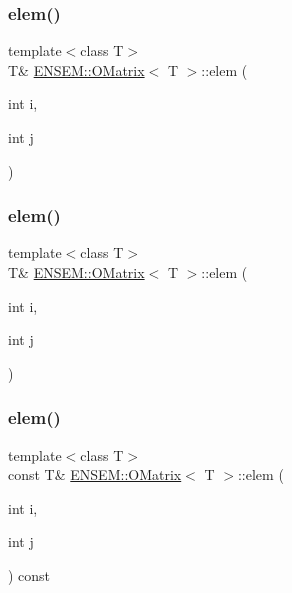\subsubsection{\texorpdfstring{elem()}{elem()}\hspace{0.1cm}{\footnotesize\ttfamily [2/6]}}
{\footnotesize\ttfamily template$<$class T$>$ \\
T\& \mbox{\hyperlink{classENSEM_1_1OMatrix}{E\+N\+S\+E\+M\+::\+O\+Matrix}}$<$ T $>$\+::elem (\begin{DoxyParamCaption}\item[{int}]{i,  }\item[{int}]{j }\end{DoxyParamCaption})\hspace{0.3cm}{\ttfamily [inline]}}

\mbox{\label{classENSEM_1_1OMatrix_a0a15388ff6dc8159664f6dc14a35b399}} 
\subsubsection{\texorpdfstring{elem()}{elem()}\hspace{0.1cm}{\footnotesize\ttfamily [3/6]}}
{\footnotesize\ttfamily template$<$class T$>$ \\
T\& \mbox{\hyperlink{classENSEM_1_1OMatrix}{E\+N\+S\+E\+M\+::\+O\+Matrix}}$<$ T $>$\+::elem (\begin{DoxyParamCaption}\item[{int}]{i,  }\item[{int}]{j }\end{DoxyParamCaption})\hspace{0.3cm}{\ttfamily [inline]}}

\mbox{\label{classENSEM_1_1OMatrix_a27e0c9e142522126542006530bd7007b}} 
\subsubsection{\texorpdfstring{elem()}{elem()}\hspace{0.1cm}{\footnotesize\ttfamily [4/6]}}
{\footnotesize\ttfamily template$<$class T$>$ \\
const T\& \mbox{\hyperlink{classENSEM_1_1OMatrix}{E\+N\+S\+E\+M\+::\+O\+Matrix}}$<$ T $>$\+::elem (\begin{DoxyParamCaption}\item[{int}]{i,  }\item[{int}]{j }\end{DoxyParamCaption}) const\hspace{0.3cm}{\ttfamily [inline]}}

